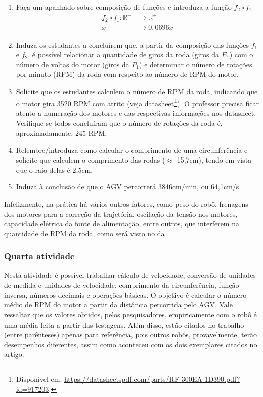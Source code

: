 \documentclass{textolivre}
\begin{document}
\begin{enumerate}
\item\label{itm1sec423} Faça um apanhado sobre composição de funções e introduza a função $f_2 \circ f_1$
    \begin{align*}
    f_2 \circ f_1: \mathbb{R}^{+} &\rightarrow \mathbb{R}^{+}  \\
    x &\rightarrow 0,0696x \nonumber
    \end{align*}

\item Induza os estudantes a concluírem que, a partir da composição das funções
$f_1$ e $f_2$, é possível relacionar a quantidade de giros da roda (giros da
$E_1$) com o número de voltas do motor (giros da $P_1$) e determinar o número
de rotações por minuto (RPM) da roda com respeito ao número de RPM do motor.

\item Solicite que os estudantes calculem o número de RPM da roda, indicando
que o motor gira 3520 RPM com atrito (veja datasheet\footnote{Disponível em:
\url{https://datasheetspdf.com/parts/RF-300EA-1D390.pdf?id=917203}.}). O
professor precisa ficar atento a numeração dos motores e das respectivas
informações nos datasheet. Verifique se todos concluíram que o número de
rotações da roda é, aproximadamente, 245 RPM.

\item Relembre/introduza como calcular o comprimento de uma circunferência e
solicite que calculem o comprimento das rodas ($\approx$ 15,7cm), tendo em
vista que o raio delas é 2,5cm.

\item Induza à conclusão de que o AGV percorrerá 3846cm/min, ou 64,1cm/s.
\end{enumerate}

Infelizmente, na prática há vários outros fatores, como peso do robô, frenagens
dos motores para a correção da trajetória, oscilação da tensão nos motores,
capacidade elétrica da fonte de alimentação, entre outros, que interferem na
quantidade de RPM da roda, como será visto no  da .

\subsubsection{Quarta atividade}\label{sec-quarta}
Nesta atividade é possível trabalhar cálculo de velocidade, conversão de
unidades de medida e unidades de velocidade, comprimento da circunferência,
função inversa, números decimais e operações básicas. O objetivo é calcular o
número médio de RPM do motor a partir da distância percorrida pelo AGV. Vale
ressaltar que os valores obtidos, pelos pesquisadores, empiricamente com o robô
é uma média feita a partir das testagens. Além disso, estão citados no trabalho
(entre parênteses) apenas para referência, pois outros robôs, provavelmente,
terão desempenhos diferentes, assim como aconteceu com os dois exemplares
citados no artigo.
\end{document}
